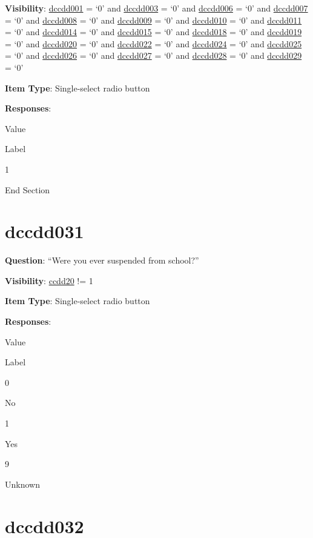\documentclass[]{book}
\begin{document}
\textbf{Visibility}: \protect\hyperlink{dccdd001}{dccdd001} = `0' and \protect\hyperlink{dccdd003}{dccdd003} = `0' and \protect\hyperlink{dccdd006}{dccdd006} = `0' and \protect\hyperlink{dccdd007}{dccdd007} = `0' and \protect\hyperlink{dccdd008}{dccdd008} = `0' and \protect\hyperlink{dccdd009}{dccdd009} = `0' and \protect\hyperlink{dccdd010}{dccdd010} = `0' and \protect\hyperlink{dccdd011}{dccdd011} = `0' and \protect\hyperlink{dccdd014}{dccdd014} = `0' and \protect\hyperlink{dccdd015}{dccdd015} = `0' and \protect\hyperlink{dccdd018}{dccdd018} = `0' and \protect\hyperlink{dccdd019}{dccdd019} = `0' and \protect\hyperlink{dccdd020}{dccdd020} = `0' and \protect\hyperlink{dccdd022}{dccdd022} = `0' and \protect\hyperlink{dccdd024}{dccdd024} = `0' and \protect\hyperlink{dccdd025}{dccdd025} = `0' and \protect\hyperlink{dccdd026}{dccdd026} = `0' and \protect\hyperlink{dccdd027}{dccdd027} = `0' and \protect\hyperlink{dccdd028}{dccdd028} = `0' and \protect\hyperlink{dccdd029}{dccdd029} = `0'

\textbf{Item Type}: Single-select radio button

\textbf{Responses}:

Value

Label

1

End Section

\hypertarget{dccdd031}{%
\section{dccdd031}\label{dccdd031}}

\textbf{Question}: ``Were you ever suspended from school?''

\textbf{Visibility}: \protect\hyperlink{ccdd20}{ccdd20} != 1

\textbf{Item Type}: Single-select radio button

\textbf{Responses}:

Value

Label

0

No

1

Yes

9

Unknown

\hypertarget{dccdd032}{%
\section{dccdd032}\label{dccdd032}}
\end{document}
